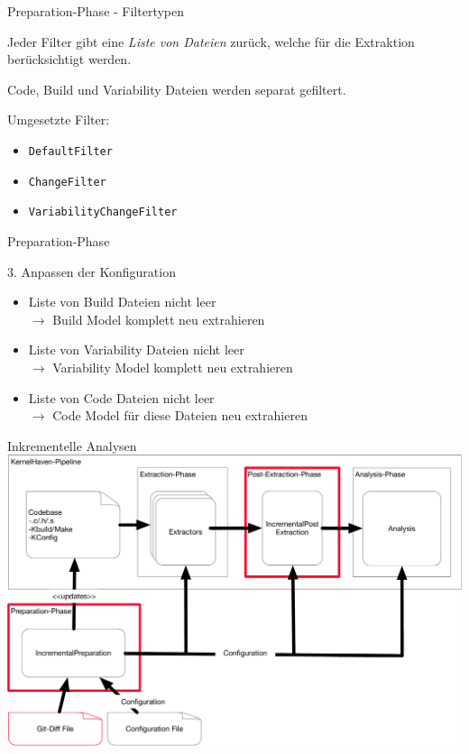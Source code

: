 \documentclass[aspectratio=43, noserifmath]{beamer}
\begin{document}
\begin{frame}[containsverbatim]{Preparation-Phase - Filtertypen}

Jeder Filter gibt eine \emph{Liste von Dateien} zur\"uck, welche f\"ur die Extraktion ber\"ucksichtigt werden.

Code, Build und Variability Dateien werden separat gefiltert.

Umgesetzte Filter:

\begin{itemize}
    \item[\textbullet] \texttt{DefaultFilter} 
    \item[\textbullet] \texttt{ChangeFilter}
    \item[\textbullet] \texttt{VariabilityChangeFilter}
\end{itemize}

\end{frame}

\begin{frame}[containsverbatim]{Preparation-Phase}

3. Anpassen der Konfiguration \\

\begin{itemize}
    \item[\textbullet] Liste von Build Dateien nicht leer \\ $\rightarrow$ Build Model \alert{komplett} neu extrahieren
    \pause
    \item[\textbullet] Liste von Variability Dateien nicht leer \\ $\rightarrow$ Variability Model \alert{komplett} neu extrahieren
    \pause
    \item[\textbullet] Liste von Code Dateien nicht leer \\ $\rightarrow$ Code Model \alert{f\"ur diese Dateien} neu extrahieren
\end{itemize}
\end{frame}


\begin{frame}[containsverbatim]{Inkrementelle Analysen}
\includegraphics[width=1\textwidth]{image/KernelHavenIncremental.pdf}
\end{frame}
\end{document}

